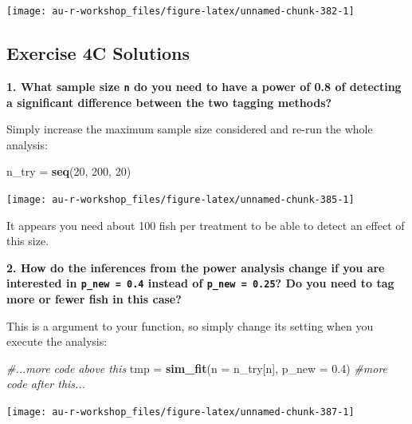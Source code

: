 \documentclass[]{book}
\newenvironment{Shaded}{\begin{snugshade}}{\end{snugshade}}
\newcommand{\CommentTok}[1]{\textcolor[rgb]{0.56,0.35,0.01}{\textit{#1}}}
\newcommand{\DataTypeTok}[1]{\textcolor[rgb]{0.13,0.29,0.53}{#1}}
\newcommand{\DecValTok}[1]{\textcolor[rgb]{0.00,0.00,0.81}{#1}}
\newcommand{\FloatTok}[1]{\textcolor[rgb]{0.00,0.00,0.81}{#1}}
\newcommand{\KeywordTok}[1]{\textcolor[rgb]{0.13,0.29,0.53}{\textbf{#1}}}
\newcommand{\NormalTok}[1]{#1}
\newcommand{\StringTok}[1]{\textcolor[rgb]{0.31,0.60,0.02}{#1}}
\begin{document}
\begin{center}\texttt{[image: au-r-workshop\_files/figure-latex/unnamed-chunk-382-1]} \end{center}

\hypertarget{ex4c-answers}{%
\subsection*{Exercise 4C Solutions}\label{ex4c-answers}}

\textbf{1. What sample size \texttt{n} do you need to have a power of 0.8 of detecting a significant difference between the two tagging methods?}

Simply increase the maximum sample size considered and re-run the whole analysis:

\begin{Shaded}
\begin{Highlighting}[]
\NormalTok{n_try =}\StringTok{ }\KeywordTok{seq}\NormalTok{(}\DecValTok{20}\NormalTok{, }\DecValTok{200}\NormalTok{, }\DecValTok{20}\NormalTok{)}
\end{Highlighting}
\end{Shaded}

\begin{center}\texttt{[image: au-r-workshop\_files/figure-latex/unnamed-chunk-385-1]} \end{center}

It appears you need about 100 fish per treatment to be able to detect an effect of this size.

\textbf{2. How do the inferences from the power analysis change if you are interested in \texttt{p\_new\ =\ 0.4} instead of \texttt{p\_new\ =\ 0.25}? Do you need to tag more or fewer fish in this case?}

This is a argument to your function, so simply change its setting when you execute the analysis:

\begin{Shaded}
\begin{Highlighting}[]
\CommentTok{#...more code above this}
\NormalTok{tmp =}\StringTok{ }\KeywordTok{sim_fit}\NormalTok{(}\DataTypeTok{n =}\NormalTok{ n_try[n], }\DataTypeTok{p_new =} \FloatTok{0.4}\NormalTok{)}
\CommentTok{#more code after this...}
\end{Highlighting}
\end{Shaded}

\begin{center}\texttt{[image: au-r-workshop\_files/figure-latex/unnamed-chunk-387-1]} \end{center}
\end{document}
